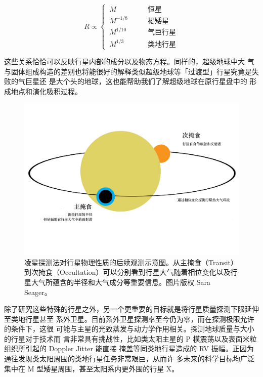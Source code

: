 \begin{equation} \label{eq:massrad}
R \propto \left\{
  \begin{array}{lr}
       \,   M            &  \qquad \text{恒星} 	   \\
       \,   M^{-1/8}  &  \qquad \text{褐矮星} 	   \\
       \,   M^{1/10} &  \qquad \text{气巨行星}   \\
       \,   M^{1/3}   &  \qquad \text{类地行星} 
  \end{array}
\right.
\end{equation} 

这些关系恰恰可以反映行星内部的成分以及物态方程\cite{Zapolsky1969}。同样的，超级地球中大
气与固体组成构造的差别也将能很好的解释类似超级地球等「过渡型」行星究竟是失败的气巨星还
是大个头的地球\cite{Rogers2015a,Lissauer2014}，这也能帮助我们了解超级地球在原行星盘中的
形成地点和演化吸积过程\cite{Miguel2011,Haghighipour2013}。

\begin{figure}[t]
\centering
\includegraphics[width=1.0\textwidth]{figures/chapter5/fig1_eclipsing.pdf}
\caption{凌星探测法对行星物理性质的后续观测示意图。从主掩食（Transit）到次掩食（Occultation）可以分别看到行星大气随着相位变化以及行星大气所蕴含的半径和大气成分等重要信息。图片版权 Sara Seager。}
\label{fig:transitspectro}
\end{figure}


除了研究这些特殊的行星之外，另一个更重要的目标就是将行星质量探测下限延伸至类地行星甚至
系外卫星。目前系外卫星探测率至今仍为零\cite{Kipping2011}，而在探测极限允许的条件下，这很
可能与主星的光致蒸发与动力学作用相关\cite{Yang2016}。探测地球质量与大小的行星对于技术而
言非常具有挑战性，比如类太阳主星的 P 模震荡以及表面米粒组织所引起的 Doppler Jitter 能直接
掩盖等同类地行星造成的 RV 振幅。正因为通往发现类太阳周围的类地行星任务非常艰巨，从而许
多未来的科学目标均广泛集中在 M 型矮星周围，甚至太阳系内更外围的行星 X\cite{Batygin2016a}。


